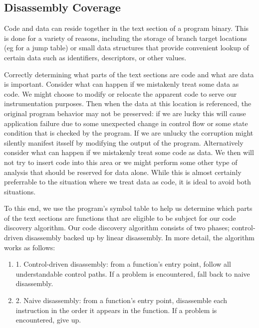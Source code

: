 \subsection{Disassembly Coverage}
Code and data can reside together in the text section of a program binary. This is done for a variety of reasons, including
the storage of branch target locations (eg for a jump table) or small data structures that provide convenient lookup
of certain data such as identifiers, descriptors, or other values.

Correctly determining
what parts of the text sections are code and what are data is important. Consider what can happen
if we mistakenly treat some data as code. We might choose to modify or relocate the apparent code
to serve our instrumentation purposes. Then when the data at this location is referenced, the
original program behavior may not be preserved: if we are lucky this will cause application failure
due to some unexpected change in control flow or some state condition that is checked by the program.
If we are unlucky the corruption might silently manifest itsself by modifying the output of the
program. Alternatively consider what can happen if we mistakenly treat some code as data. We then will
not try to insert code into this area or we might perform some other type of analysis that should be reserved for
data alone. While this is almost certainly preferrable to the situation where we treat data as code, it
is ideal to avoid both situations.

To this end, we use the program's symbol table to help us determine which parts of the text sections
are functions that are eligible to be subject for our code discovery algorithm. Our code discovery algorithm
consists of two phases; control-driven disassembly backed up by linear disassembly. In more detail, the algorithm
works as follows:

\begin{enumerate}
\item 
1. Control-driven disassembly: from a function's entry point, follow all understandable control paths. If a problem is encountered, fall back to
naive disassembly.
\item
2. Naive disassembly: from a function's entry point, disassemble each instruction in the order it appears in the
function. If a problem is encountered, give up.
\end{enumerate}


